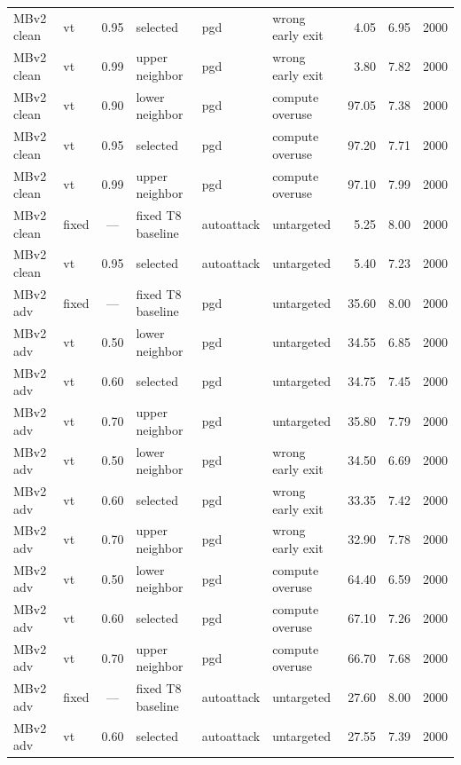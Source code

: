 {\begin{longtable}{@{}l l c l l l r r r@{}}
MBv2 clean & vt & 0.95 & selected & pgd & wrong early exit & 4.05 & 6.95 & 2000 \\
MBv2 clean & vt & 0.99 & upper neighbor & pgd & wrong early exit & 3.80 & 7.82 & 2000 \\
MBv2 clean & vt & 0.90 & lower neighbor & pgd & compute overuse & 97.05 & 7.38 & 2000 \\
MBv2 clean & vt & 0.95 & selected & pgd & compute overuse & 97.20 & 7.71 & 2000 \\
MBv2 clean & vt & 0.99 & upper neighbor & pgd & compute overuse & 97.10 & 7.99 & 2000 \\
MBv2 clean & fixed & --- & fixed T8 baseline & autoattack & untargeted & 5.25 & 8.00 & 2000 \\
MBv2 clean & vt & 0.95 & selected & autoattack & untargeted & 5.40 & 7.23 & 2000 \\
\addlinespace
MBv2 adv & fixed & --- & fixed T8 baseline & pgd & untargeted & 35.60 & 8.00 & 2000 \\
MBv2 adv & vt & 0.50 & lower neighbor & pgd & untargeted & 34.55 & 6.85 & 2000 \\
MBv2 adv & vt & 0.60 & selected & pgd & untargeted & 34.75 & 7.45 & 2000 \\
MBv2 adv & vt & 0.70 & upper neighbor & pgd & untargeted & 35.80 & 7.79 & 2000 \\
MBv2 adv & vt & 0.50 & lower neighbor & pgd & wrong early exit & 34.50 & 6.69 & 2000 \\
MBv2 adv & vt & 0.60 & selected & pgd & wrong early exit & 33.35 & 7.42 & 2000 \\
MBv2 adv & vt & 0.70 & upper neighbor & pgd & wrong early exit & 32.90 & 7.78 & 2000 \\
MBv2 adv & vt & 0.50 & lower neighbor & pgd & compute overuse & 64.40 & 6.59 & 2000 \\
MBv2 adv & vt & 0.60 & selected & pgd & compute overuse & 67.10 & 7.26 & 2000 \\
MBv2 adv & vt & 0.70 & upper neighbor & pgd & compute overuse & 66.70 & 7.68 & 2000 \\
MBv2 adv & fixed & --- & fixed T8 baseline & autoattack & untargeted & 27.60 & 8.00 & 2000 \\
MBv2 adv & vt & 0.60 & selected & autoattack & untargeted & 27.55 & 7.39 & 2000 \\
\bottomrule
\end{longtable}}

